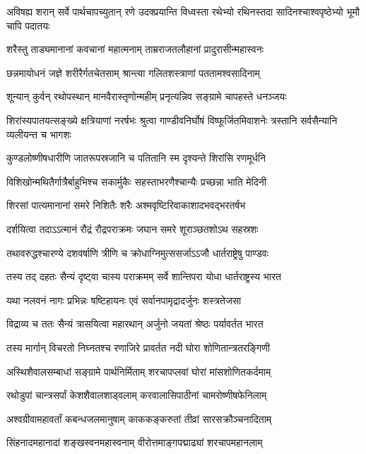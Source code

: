 \threelineshloka
{अविषह्य शरान् सर्वे पार्थचापच्युतान् रणे}
{उदक्प्रयान्ति विध्वस्ता रथेभ्यो रथिनस्तदा}
{सादिनश्चाश्वपृष्ठेभ्यो भूमौ चापि पदातयः}


\twolineshloka
{शरैस्तु ताड्यमानानां कवचानां महात्मनाम्}
{ताम्रराजतलौहानां प्रादुरासीन्महास्वनः}


\twolineshloka
{छन्नमायोधनं जज्ञे शरीरैर्गतचेतसाम्}
{श्रान्त्या गलितशस्त्राणां पततामश्वसादिनाम्}


\twolineshloka
{शून्यान् कुर्वन् रथोपस्थान् मानवैरास्तृणोन्महीम्}
{प्रनृत्यन्निव सङ्ग्रामे चापहस्ते धनञ्जयः}


\threelineshloka
{शिरांस्यपातयत्सङ्ख्ये क्षत्रियाणां नरर्षभः}
{श्रुत्वा गाण्डीवनिर्घोषं विष्फूर्जितमिवाशनेः}
{त्रस्तानि सर्वसैन्यानि व्यलीयन्त च भागशः}


\twolineshloka
{कुण्डलोष्णीषधारीणि जातरूपस्रजानि च}
{पतितानि स्म दृश्यन्ते शिरांसि रणमूर्धनि}


\twolineshloka
{विशिखोन्मथितैर्गात्रैर्बाहुभिश्च सकार्मुकैः}
{सहस्ताभरणैश्चान्यैः प्रच्छन्ना भाति मेदिनी}


\twolineshloka
{शिरसां पात्यमानानां समरे निशितैः शरैः}
{अश्मवृष्टिरिवाकाशादभवद्भरतर्षभ}


\twolineshloka
{दर्शयित्वा तदाऽऽत्मानं रौद्रं रौद्रपराक्रमः}
{जघान समरे शूराञ्छतशोऽथ सहस्रशः}


\twolineshloka
{तथावरुद्धश्चारण्ये दशवर्षाणि त्रीणि च}
{क्रोधाग्निमुत्ससर्जाऽऽजौ धार्तराष्ट्रेषु पाण्डवः}


\twolineshloka
{तस्य तद् दहतः सैन्यं दृष्ट्वा चास्य पराक्रमम्}
{सर्वे शान्तिपरा योधा धार्तराष्ट्रस्य भारत}


\twolineshloka
{यथा नलवनं नागः प्रभिन्नः षष्टिहायनः}
{एवं सर्वानपामृद्रादर्जुनः शस्त्रतेजसा}


\twolineshloka
{विद्राव्य च ततः सैन्यं त्रासयित्वा महारथान्}
{अर्जुनो जयतां श्रेष्ठः पर्यावर्तत भारत}


\twolineshloka
{तस्य मार्गान् विचरतो निघ्नतश्च रणाजिरे}
{प्रावर्तत नदी घोरा शोणितान्त्रतरङ्गिणी}


\twolineshloka
{अस्थिशैवालसम्बाधां सङ्ग्रामे पार्थनिर्मिताम्}
{शरचापप्लवां घोरां मांसशोणितकर्दमाम्}


\twolineshloka
{रथोडुपां चान्त्रसर्पां केशशैवालशाड्वलाम्}
{करवालासिपाठीनां चामरोष्णीषफेनिलाम्}


\twolineshloka
{अश्वग्रीवामहावर्तां कबन्धजलमानुषाम्}
{काककङ्करुतां तीव्रां सारसक्रौञ्चनादिताम्}


\twolineshloka
{सिंहनादमहानादां शङ्खस्वनमहास्वनाम्}
{वीरोत्तमाङ्गपद्माढ्यां शरचापमहानलाम्}


